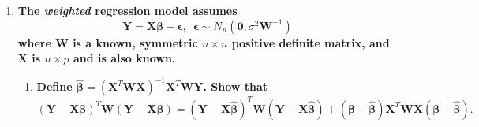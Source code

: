 \documentclass[11pt]{article}
\newenvironment{solution}
  {\renewcommand\qedsymbol{$\blacksquare$}\begin{proof}[Solution]}
  {\end{proof}}
\begin{document}
\begin{enumerate}
    \begin{solution}
    For families in the 90th percentile of income, we expect the proportionto be at or above the
    90th percentile of consumption to be  
    This follows from the fact that the relation of family income to consumption is positive and roughly linear, so
    we expect families with higher incomes to have higher levels of consumption.

    \end{solution}
   
	\newpage
	
    \item \textbf{The \textit{weighted} regression model assumes}
    \[
      \bm{Y} = \bm{X\beta} + \bm{\epsilon}, \, \, \, \bm{\epsilon} \sim N_n(\bm{0}, \sigma^{2}\bm{W}^{-1})
    \]
    \textbf{where $\bm{W}$ is a known, symmetric $n \times n$ positive definite matrix, and $\bm{X}$ is $n \times p$ and is also known.}

    \begin{enumerate}
      \item \textbf{Define $\hat{\bm{\beta}} = (\bm{X}^T \bm{WX})^{-1} \bm{X}^T \bm{WY}$. Show that}
      \[
        (\bm{Y} - \bm{X\beta})^T\bm{W}(\bm{Y} - \bm{X\beta}) = (\bm{Y} - \bm{X}\hat{\bm{\beta}})^T\bm{W}(\bm{Y} - \bm{X\hat{\bm{\beta}}}) + (\bm{\beta} - \hat{\bm{\beta}})\bm{X}^T\bm{WX}(\bm{\beta} - \hat{\bm{\beta}}).
      \]


\end{enumerate}
\end{enumerate}
\end{document}
